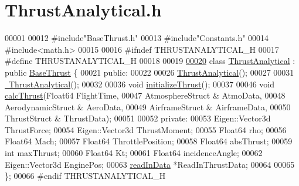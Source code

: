 \hypertarget{_thrust_analytical_8h_source}{}\section{Thrust\+Analytical.\+h}
\label{_thrust_analytical_8h_source}

\begin{DoxyCode}
00001 
00012 \textcolor{preprocessor}{#include"BaseThrust.h"}
00013 \textcolor{preprocessor}{#include"Constants.h"}
00014 \textcolor{preprocessor}{#include<math.h>}
00015 
00016 \textcolor{preprocessor}{#ifndef THRUSTANALYTICAL\_H}
00017 \textcolor{preprocessor}{#define THRUSTANALYTICAL\_H}
00018 
00019 
\hyperlink{group___engine}{00020} \textcolor{keyword}{class }\hyperlink{group___engine_class_thrust_analytical}{ThrustAnalytical} : \textcolor{keyword}{public} \hyperlink{group___engine_class_base_thrust}{BaseThrust} \{
00021 \textcolor{keyword}{public}:
00022 
00026     \hyperlink{group___engine_a5c75949a22871e861090560adb2d5f18}{ThrustAnalytical}();
00027 
00031     \hyperlink{group___engine_aeaf9dd69c10812c673d6cfae0d7ca4fd}{~ThrustAnalytical}();
00032 
00036     \textcolor{keywordtype}{void} \hyperlink{group___engine_a5c1db29b00aa92e9f22806b0ea482e05}{initializeThrust}();
00037 
00046     \textcolor{keywordtype}{void} \hyperlink{group___engine_a521b775b57dc2324f09496efb8b12452}{calcThrust}(Float64 FlightTime,                   
00047                     AtmosphereStruct & AtmoData,        
00048                     AerodynamicStruct & AeroData,       
00049                     AirframeStruct & AirframeData,      
00050                     ThrustStruct & ThrustData);         
00051 
00052 \textcolor{keyword}{private}:
00053     Eigen::Vector3d ThrustForce;        
00054     Eigen::Vector3d ThrustMoment;       
00055     Float64 rho;                        
00056     Float64 Mach;                       
00057     Float64 ThrottlePosition;           
00058     Float64 absThrust;                  
00059     \textcolor{keywordtype}{int} maxThrust;                      
00060     Float64 Kt;                         
00061     Float64 incidenceAngle;             
00062     Eigen::Vector3d EnginePos;          
00063     \hyperlink{classread_in_data}{readInData} *ReadInThrustData;     
00064 
00065 \};
00066 \textcolor{preprocessor}{#endif  THRUSTANALYTICAL\_H}
\end{DoxyCode}
